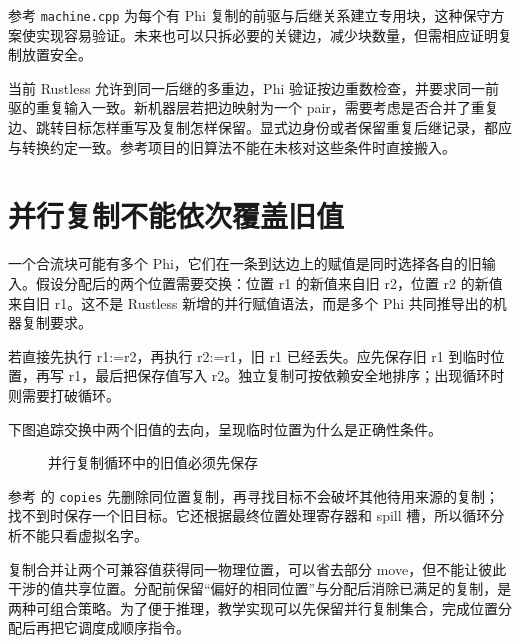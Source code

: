 参考 \texttt{machine.cpp} 为每个有 Phi 复制的前驱与后继关系建立专用块，这种保守方案使实现容易验证。未来也可以只拆必要的关键边，减少块数量，但需相应证明复制放置安全。

当前 Rustless 允许到同一后继的多重边，Phi 验证按边重数检查，并要求同一前驱的重复输入一致。新机器层若把边映射为一个 pair，需要考虑是否合并了重复边、跳转目标怎样重写及复制怎样保留。显式边身份或者保留重复后继记录，都应与转换约定一致。参考项目的旧算法不能在未核对这些条件时直接搬入。

\section{并行复制不能依次覆盖旧值}
一个合流块可能有多个 Phi，它们在一条到达边上的赋值是同时选择各自的旧输入。假设分配后的两个位置需要交换：位置 r1 的新值来自旧 r2，位置 r2 的新值来自旧 r1。这不是 Rustless 新增的并行赋值语法，而是多个 Phi 共同推导出的机器复制要求。

若直接先执行 r1:=r2，再执行 r2:=r1，旧 r1 已经丢失。应先保存旧 r1 到临时位置，再写 r1，最后把保存值写入 r2。独立复制可按依赖安全地排序；出现循环时则需要打破循环。

下图追踪交换中两个旧值的去向，呈现临时位置为什么是正确性条件。
\begin{figure}[htbp]\centering
{}
\caption{并行复制循环中的旧值必须先保存}
\end{figure}

参考  的 \texttt{copies} 先删除同位置复制，再寻找目标不会破坏其他待用来源的复制；找不到时保存一个旧目标。它还根据最终位置处理寄存器和 spill 槽，所以循环分析不能只看虚拟名字。

复制合并让两个可兼容值获得同一物理位置，可以省去部分 move，但不能让彼此干涉的值共享位置。分配前保留“偏好的相同位置”与分配后消除已满足的复制，是两种可组合策略。为了便于推理，教学实现可以先保留并行复制集合，完成位置分配后再把它调度成顺序指令。

